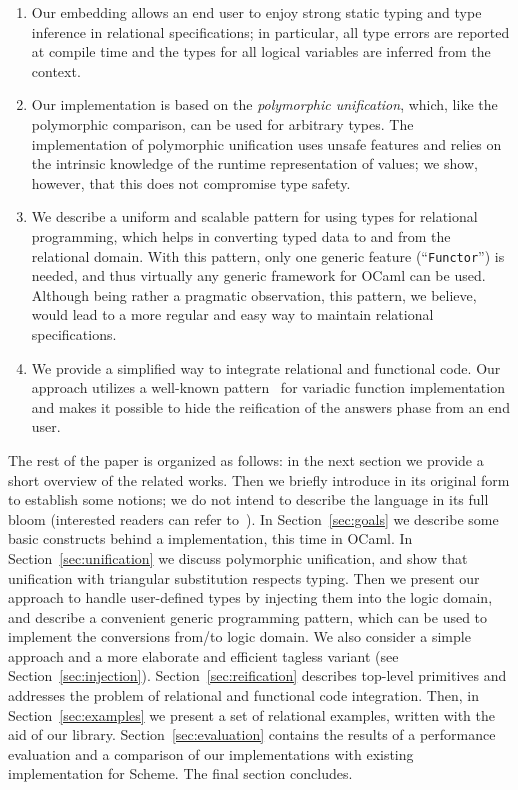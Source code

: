 \begin{enumerate}
\item Our embedding allows an end user to enjoy strong static typing and type inference in relational
specifications; in particular, all type errors are reported at compile time and the types for
all logical variables are inferred from the context.

\item Our implementation is based on the \emph{polymorphic unification}, which, like the polymorphic comparison,
can be used for arbitrary types. The implementation of polymorphic unification uses unsafe features and
relies on the intrinsic knowledge of the runtime representation of values; we show, however, that this does not
compromise type safety.

\item We describe a uniform and scalable pattern for using types for relational programming, which
helps in converting typed data to and from the relational domain. With this pattern, only one
generic feature (``\lstinline{Functor}'') is needed, and thus virtually any generic
framework for OCaml can be used. Although being rather a pragmatic observation, this pattern, we
believe, would lead to a more regular and easy way to maintain relational specifications.

\item We provide a simplified way to integrate relational and functional code. Our approach utilizes
a well-known pattern~\cite{Unparsing, DoWeNeed} for variadic function implementation and makes it
possible to hide the reification of the answers phase from an end user.
\end{enumerate}

The rest of the paper is organized as follows: in the next section we provide a short overview of the related
works. Then we briefly introduce \miniKanren in
its original form to establish some notions; we do not intend to describe the language in its full bloom (interested readers can
refer to~\cite{TRS}). In Section~\ref{sec:goals} we describe some basic constructs behind a \miniKanren implementation, this time
in OCaml. In Section~\ref{sec:unification} we discuss polymorphic unification, and show that unification with
triangular substitution respects typing. Then we present our approach to handle user-defined types by injecting them
into the logic domain, and describe a convenient generic programming pattern, which can be used to implement the conversions from/to logic
domain. We also consider a simple approach and a more elaborate and efficient tagless variant (see Section~\ref{sec:injection}).
Section~\ref{sec:reification} describes top-level primitives and addresses the problem of relational and functional code integration.
Then, in Section~\ref{sec:examples} we present a set of relational examples, written with the aid of our
library. Section~\ref{sec:evaluation} contains the results of a performance evaluation and a comparison of our implementations
with existing implementation for Scheme. The final section concludes.

